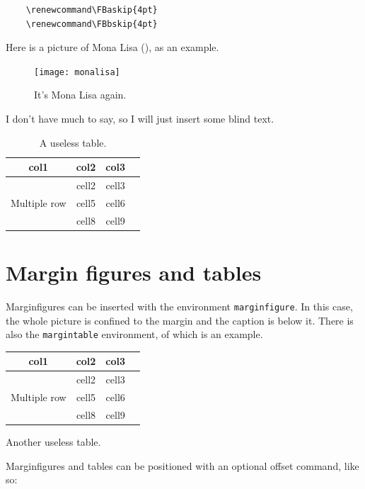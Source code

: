 \begin{verbatim}
	\renewcommand\FBaskip{4pt}
	\renewcommand\FBbskip{4pt}
\end{verbatim}

Here is a picture of Mona Lisa (), as an example.

\begin{figure}[h]
	\texttt{[image: monalisa]}
	\caption[Mona Lisa, again]{It's Mona Lisa again. \blindtext}
\end{figure}

I don't have much to say, so I will just insert some blind text. 
\blindtext

\begin{table}
\begin{tabular}{ |c|c|c|c| } 
\hline
col1 & col2 & col3 \\
\hline
\multirow{3}{4em}{Multiple row} & cell2 & cell3 \\ 
& cell5 & cell6 \\ 
& cell8 & cell9 \\ 
\hline
\end{tabular}
\caption[A useless table]{A useless table.}
\end{table}

\blindtext

\section{Margin figures and tables}

Marginfigures can be inserted with the environment \verb|marginfigure|. 
In this case, the whole picture is confined to the margin and the 
caption is below it. There is also the \verb|margintable| environment, 
of which  is an example.

\begin{margintable}[*-6]
\begin{tabular}{ |c|c|c|c| } 
\hline
col1 & col2 & col3 \\
\hline
\multirow{3}{4em}{Multiple row} & cell2 & cell3 \\ 
& cell5 & cell6 \\ 
& cell8 & cell9 \\ 
\hline
\end{tabular}
\caption[Another useless table]{Another useless table.}
\end{margintable}

Marginfigures and tables can be positioned with an optional offset 
command, like so:

